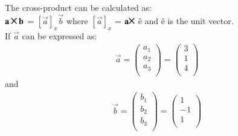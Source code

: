 %      
%
%
The cross-product can be calculated as:\\
$\vec{a} \Cross \vec{b} $ = $[\vec{a}]_x \vec{b}$
where $[\vec{a}]_x$ = $\vec{a} \Cross $ \^e 
and \^e is the unit vector. \\
If $\vec{a}$ can be expressed as:\\
\begin{equation}
\begin{aligned}
      \vec{a} = \begin{pmatrix}
      a_1 \\ 
      a_2 \\
      a_3 \\
      
    \end{pmatrix} = \begin{pmatrix}
      3 \\ 
      1 \\
      4 \\
      
    \end{pmatrix}
\end{aligned}
\end{equation} and 
\begin{equation}
\begin{aligned}
      \vec{b} = \begin{pmatrix}
      b_1 \\ 
      b_2 \\
      b_3 \\
      
    \end{pmatrix} = \begin{pmatrix}
      1 \\ 
      -1 \\
      1 \\
      
    \end{pmatrix}
\end{aligned}
\end{equation}
